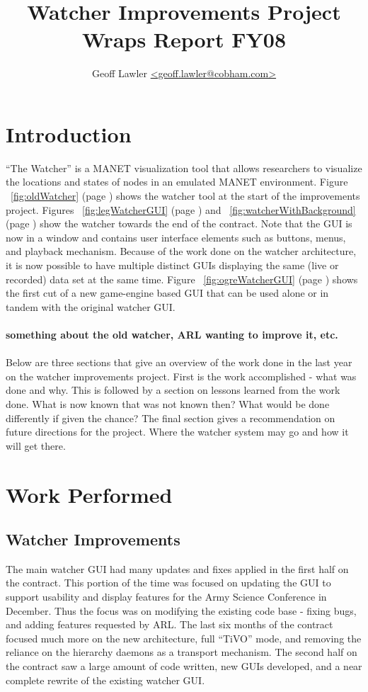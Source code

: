 \documentclass{report}
\author{Geoff Lawler \url{<geoff.lawler@cobham.com>}}
\title{{\bf Watcher Improvements Project}\\Wraps Report FY08}
\begin{document}
\maketitle

\renewcommand*\thesection{\arabic{section}}

\section{Introduction}

``The Watcher'' is a MANET visualization tool that allows researchers to visualize the locations and states of nodes in an emulated MANET environment. 
Figure ~\ref{fig:oldWatcher} (page \pageref{fig:oldWatcher}) shows the watcher tool at the start of the improvements project. Figures ~\ref{fig:legWatcherGUI} (page \pageref{fig:legWatcherGUI}) and ~\ref{fig:watcherWithBackground}
(page \pageref{fig:watcherWithBackground}) show the watcher towards the end of the contract. Note that the GUI is now in a window and contains user interface elements such as buttons, menus, and playback
mechanism. Because of the work done on the watcher architecture, it is now possible to have multiple distinct GUIs displaying the same (live or recorded) data 
set at the same time. Figure ~\ref{fig:ogreWatcherGUI} (page \pageref{fig:ogreWatcherGUI}) shows the first cut of a new game-engine based GUI that can be used alone or in tandem with the original watcher GUI. 
\\\\
{\bf something about the old watcher, ARL wanting to improve it, etc. }
\\\\
Below are three sections that give an overview of the work done in the last year on the watcher improvements project. First
is the work accomplished - what was done and why. This is followed by a section on lessons learned from the work done. What is now known 
that was not known then? What would be done differently if given the chance? The final section gives a recommendation on future directions
for the project. Where the watcher system may go and how it will get there. 

\section{Work Performed}

\subsection{Watcher Improvements}
The main watcher GUI had many updates and fixes applied in the first half on the contract. This portion of the time was focused on updating the GUI to 
support usability and display features for the Army Science Conference in December. Thus the focus was on modifying the existing code base - fixing bugs, 
and adding features requested by ARL. The last six months of the contract focused much more on the new architecture, full ``TiVO'' mode, and removing 
the reliance on the hierarchy daemons as a transport mechanism. The second half on the contract saw a large amount of code written, new GUIs developed, and 
a near complete rewrite of the existing watcher GUI. 
\end{document}
